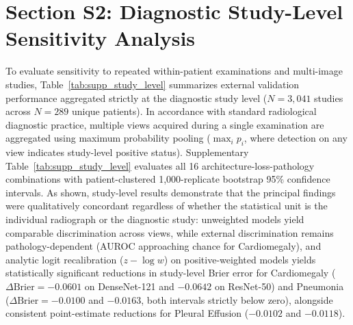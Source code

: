 \documentclass[preprint,12pt]{elsarticle}
\begin{document}
\section*{Section S2: Diagnostic Study-Level Sensitivity Analysis}
To evaluate sensitivity to repeated within-patient examinations and multi-image studies, Table~\ref{tab:supp_study_level} summarizes external validation performance aggregated strictly at the diagnostic study level ($N = 3,041$ studies across $N = 289$ unique patients). In accordance with standard radiological diagnostic practice, multiple views acquired during a single examination are aggregated using maximum probability pooling ($\max_i p_i$, where detection on any view indicates study-level positive status). Supplementary Table~\ref{tab:supp_study_level} evaluates all 16 architecture-loss-pathology combinations with patient-clustered 1,000-replicate bootstrap 95\% confidence intervals. As shown, study-level results demonstrate that the principal findings were qualitatively concordant regardless of whether the statistical unit is the individual radiograph or the diagnostic study: unweighted models yield comparable discrimination across views, while external discrimination remains pathology-dependent (AUROC approaching chance for Cardiomegaly), and analytic logit recalibration ($z - \log w$) on positive-weighted models yields statistically significant reductions in study-level Brier error for Cardiomegaly ($\Delta\text{Brier} = -0.0601$ on DenseNet-121 and $-0.0642$ on ResNet-50) and Pneumonia ($\Delta\text{Brier} = -0.0100$ and $-0.0163$, both intervals strictly below zero), alongside consistent point-estimate reductions for Pleural Effusion ($-0.0102$ and $-0.0118$).
\end{document}
